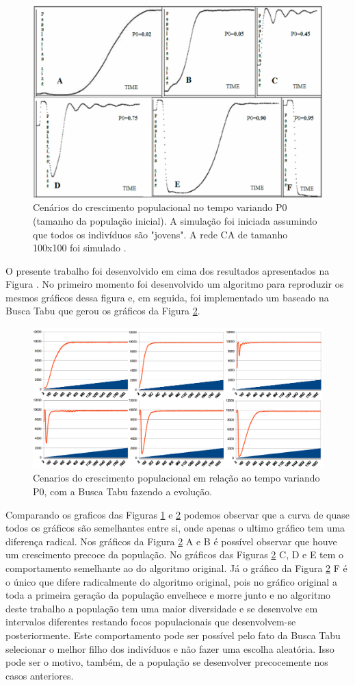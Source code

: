 \documentclass[12pt]{article}
\begin{document}
\begin{figure}[h!]
\centering
\includegraphics[width=.5\textwidth]{imagens/crescimento-populacao-no-tempo}
\caption{Cenários do crescimento populacional no tempo variando P0 (tamanho 
da população inicial). A simulação foi iniciada assumindo que todos os 
indivíduos são "jovens". A rede CA de tamanho 100x100 foi simulado 
\cite{dzwinel:04}.}
\label{fig:crescimento-populacao-no-tempo}
\end{figure}

O presente trabalho foi desenvolvido em cima dos resultados apresentados na
Figura \cite{dzwinel:04}. No primeiro momento foi desenvolvido um algoritmo
para reproduzir os mesmos gráficos dessa figura e, em seguida, foi
implementado um baseado na Busca Tabu que gerou os gráficos da Figura 
\ref{fig:cenarios}.


\begin{figure}[h!]
\centering
\includegraphics[width=.9\textwidth]{imagens/cenarios}
\caption{Cenarios do crescimento populacional em relação ao tempo variando P0,
com a Busca Tabu fazendo a evolução.}
\label{fig:cenarios}
\end{figure}

Comparando os graficos das Figuras \ref{fig:crescimento-populacao-no-tempo} e
\ref{fig:cenarios} podemos observar que a curva de quase todos os gráficos
são semelhantes entre si, onde apenas o ultimo gráfico tem uma diferença 
radical. Nos gráficos da Figura \ref{fig:cenarios} A e B é possível observar
que houve um crescimento precoce da população. No gráficos das Figuras
\ref{fig:cenarios} C, D e E tem o comportamento semelhante ao do algoritmo
original. Já o gráfico da Figura \ref{fig:cenarios} F é o único que difere
radicalmente do algoritmo original, pois no gráfico original a toda a primeira
geração da população envelhece e morre junto e no algoritmo deste trabalho a
população tem uma maior diversidade e se desenvolve em intervalos diferentes
restando focos populacionais que desenvolvem-se posteriormente. Este 
comportamento pode ser possível pelo fato da Busca Tabu selecionar o melhor 
filho dos indivíduos e não fazer uma escolha aleatória. Isso pode ser o motivo, 
também, de a população se desenvolver precocemente nos casos anteriores.
\end{document}
